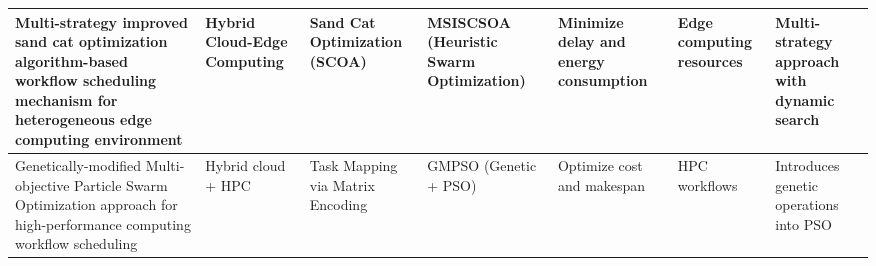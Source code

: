 \documentclass[a4paper, final]{article}
\begin{document}
\begin{table}[H]
\begin{tabularx}{\textwidth}{|p{3.5cm}|X|X|p{2cm}|X|X|X|}
    
    Multi-strategy improved sand cat optimization algorithm-based workflow scheduling mechanism for heterogeneous edge computing environment \cite{bib:3_sandcat} &
    Hybrid Cloud-Edge Computing &
    Sand Cat Optimization (SCOA) &
    MSISCSOA (Heuristic Swarm Optimization) &
    Minimize delay and energy consumption &
    Edge computing resources &
    Multi-strategy approach with dynamic search \\
    \hline

    Genetically-modified Multi-objective Particle Swarm Optimization approach for high-performance computing workflow scheduling \cite{bib:10} &
    Hybrid cloud + HPC &
    Task Mapping via Matrix Encoding &
    GMPSO (Genetic + PSO) &
    Optimize cost and makespan &
    HPC workflows &
    Introduces genetic operations into PSO \\
    \hline
    \end{tabularx}
\end{table}

\cleardoublepage
{}
\newpage
\end{document}
